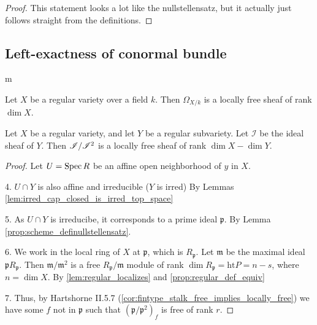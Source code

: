 \begin{corollary}
\begin{proof}
  This statement looks a lot like the nullstellensatz,
  but it actually just follows straight from the
  definitions.
\end{proof}

\subsection{Left-exactness of conormal bundle}
m
\begin{theorem}
  \label{thm:regular_implies_kahler_diff_free}
  Let $X$ be a regular variety over a field $k$.
  Then $\Omega_{X/k}$ is a locally free sheaf of
  rank $\dim X$.
\end{theorem}

\begin{lemma}
  \label{lem:reg_subvar_conormal_locally_free}
  Let $X$ be a regular variety, and let $Y$ be a regular
  subvariety.
  Let $\mathcal{I}$ be the ideal sheaf of $Y$.
  Then $\mathscr{I} / \mathscr{I}^{2}$ is a locally free sheaf of rank 
  $\dim X - \dim Y$.
\end{lemma}

\begin{proof}

  Let $U = \operatorname{Spec} R$ be an affine open neighborhood of $y$ in $X$.
  
  4. $U \cap Y$ is also affine and irreducible ($Y$ is irred)
     By Lemmas \ref{lem:irred_cap_closed_is_irred_top_space}

  5. As $U \cap Y$ is irreducibe, it corresponds to a prime ideal
     $\mathfrak{p}$.
     By Lemma \ref{prop:scheme_definullstellensatz}.

  6. We work in the local ring of $X$ at $\mathfrak{p}$, which is $R_\mathfrak{p}$.
     Let $\mathfrak{m}$ be the maximal ideal $\mathfrak{p} R_\mathfrak{p}$.
     Then $\mathfrak{m} / \mathfrak{m}^2$ is a free 
     $R_\mathfrak{p} / \mathfrak{m}$ module of rank
     $\dim R_\mathfrak{p} = \text{ht} P = n-s$, where $n = \dim X$.
     By \ref{lem:regular_localizes} and \ref{prop:regular_def_equiv}


  7. Thus, by Hartshorne II.5.7 
     (\ref{cor:fintype_stalk_free_implies_locally_free}) 
     we have some $f$ not in $\mathfrak{p}$
     such that $(\mathfrak{p} / \mathfrak{p}^2)_f$ is free of rank $r$.
\end{proof}


\end{corollary}
